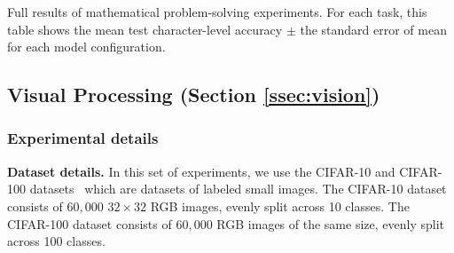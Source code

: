 \begin{table}
    \resizebox{\textwidth}{!}{%
    
    }
    \caption{Full results of mathematical problem-solving experiments. For each task, this table shows the mean test character-level accuracy $\pm$ the standard error of mean for each model configuration.}\label{tab:math_full_results}
\end{table}






\subsection{Visual Processing (Section \ref{ssec:vision})}\label{ssec:appendix_vision}

\subsubsection*{Experimental details}

\textbf{Dataset details.} In this set of experiments, we use the CIFAR-10 and CIFAR-100 datasets~\citep{cifar_dataset} which are datasets of labeled small images. The CIFAR-10 dataset consists of $60,000$ $32 \times 32$ RGB images, evenly split across 10 classes. The CIFAR-100 dataset consists of $60,000$ RGB images of the same size, evenly split across 100 classes.

